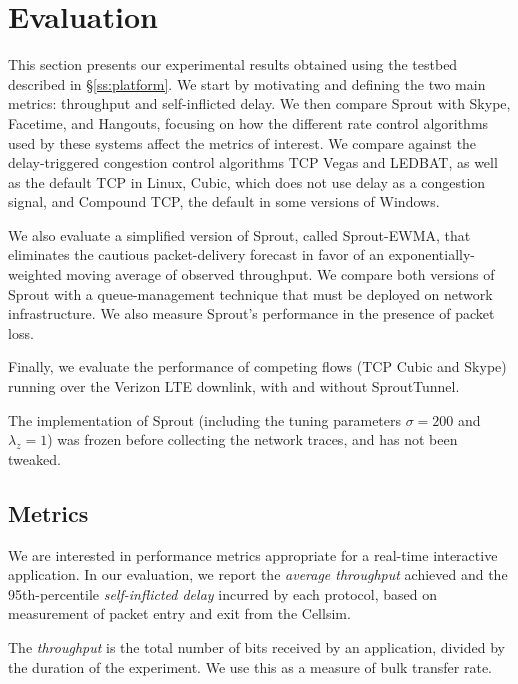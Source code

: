 \section{Evaluation}
\label{sprout:eval}

This section presents our experimental results obtained using the
testbed described
in \S\ref{ss:platform}. We start by motivating and defining the two
main metrics: throughput and self-inflicted delay. We then compare
Sprout with Skype, Facetime, and Hangouts, focusing on how the
different rate control algorithms used by these systems affect the
metrics of interest. We compare against the delay-triggered congestion
control algorithms TCP Vegas and LEDBAT, as well as the
default TCP in Linux, Cubic, which does not use delay as a
congestion signal, and Compound TCP, the default in some
versions of Windows.

We also evaluate a simplified version of Sprout, called Sprout-EWMA,
that eliminates the cautious packet-delivery forecast in favor of an
exponentially-weighted moving average of observed throughput. We
compare both versions of Sprout with a queue-management technique that
must be deployed on network infrastructure. We also measure Sprout's
performance in the presence of packet loss.

Finally, we evaluate the performance of competing flows (TCP Cubic
and Skype) running over the Verizon LTE downlink, with and without
SproutTunnel.

The implementation of Sprout (including the tuning parameters $\sigma
= 200$ and $\lambda_z = 1$) was frozen before collecting the network
traces, and has not been tweaked.

\subsection{Metrics}

We are interested in performance metrics appropriate for a real-time
interactive application. In our evaluation, we report the
\emph{average throughput} achieved and the 95th-percentile
\emph{self-inflicted delay} incurred by each protocol, based on
measurement of packet entry and exit from the Cellsim.

The \emph{throughput} is the total number of bits received by an
application, divided by the duration of the experiment. We use this as
a measure of bulk transfer rate.

